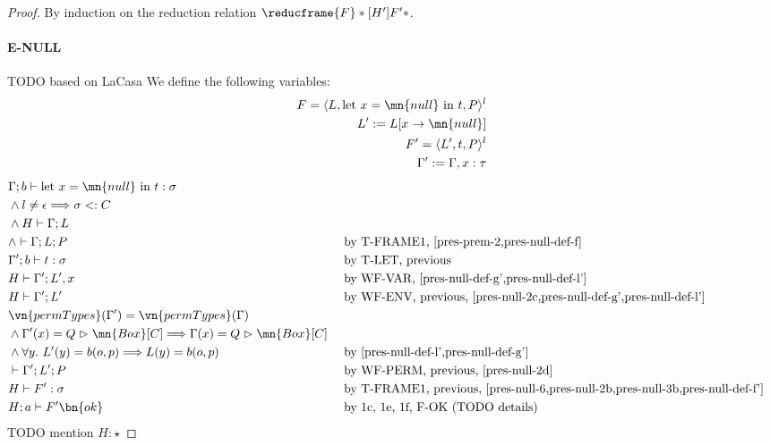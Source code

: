 \begin{proof}
By induction on the reduction relation $\reducframe{F}*[H']{F'}*$.

\paragraph{E-NULL}
TODO based on LaCasa
We define the following variables:
\begin{alignat}{3}
    F = \langle L, \text{let } x = \mn{null} \text{ in } t, P \rangle^l \label{pres-null-def-f}\\
    L' := L[x \rightarrow \mn{null}] \label{pres-null-def-l'}\\
    F' = \langle L', t, P \rangle^l \label{pres-null-def-f'}\\
    \Gamma' := \Gamma, x : \tau \label{pres-null-def-g'}\\
\end{alignat}
\begin{alignat}{3}
    &\Gamma; b \vdash \text{let } x = \mn{null} \text{ in } t : \sigma\\
    &\wedge l \neq \epsilon \Longrightarrow \sigma <: C \label{pres-null-2b}\\
    &\wedge H \vdash \Gamma; L \label{pres-null-2c}\\
    &\wedge \vdash \Gamma; L; P \label{pres-null-2d}
        && \text{ by T-FRAME1, \cref{pres-prem-2,pres-null-def-f}}\\
    &\Gamma'; b \vdash t : \sigma \label{pres-null-3b}
        && \text{ by T-LET, previous}\\
    &H \vdash \Gamma'; L', x \label{pres-null-5}
        && \text{ by WF-VAR, \cref{pres-null-def-g',pres-null-def-l'}}\\
    &H \vdash \Gamma'; L' \label{pres-null-6}
        && \text{ by WF-ENV, previous, \cref{pres-null-2c,pres-null-def-g',pres-null-def-l'}}\\
    &\vn{permTypes}(\Gamma') = \vn{permTypes}(\Gamma)\\
    &\wedge \Gamma'(x) = Q \vartriangleright \mn{Box}[C] \Longrightarrow \Gamma(x) = Q \vartriangleright \mn{Box}[C]\\
    &\wedge \forall y.\ L'(y) = b(o,p) \Longrightarrow L(y) = b(o,p)
        && \text{ by \cref{pres-null-def-l',pres-null-def-g'}}\\
    &\vdash \Gamma'; L'; P
        && \text{ by WF-PERM, previous, \cref{pres-null-2d}}\\
    &H \vdash F' : \sigma
        && \text{ by T-FRAME1, previous, \cref{pres-null-6,pres-null-2b,pres-null-3b,pres-null-def-f'}}\\
    &H; a \vdash F' \bn{ok}
        && \text{ by 1c, 1e, 1f, F-OK (TODO details)}
\end{alignat}
TODO mention $H : \star$


\end{proof}
